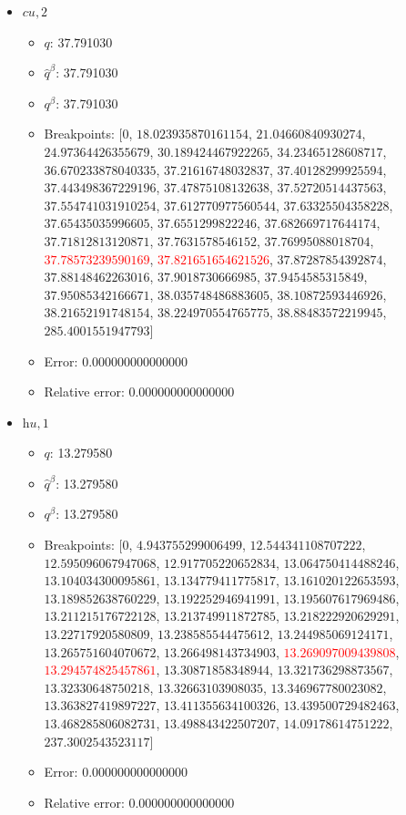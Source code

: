 \documentclass{article}%
\begin{document}
\begin{itemize}
\begin{itemize}
		\item Error: 0.000000000000000%
		\item Relative error: 0.000000000000000%
	\end{itemize}%
	\item $\textit{cu},2$%
	\begin{itemize}%
		\item $q$: 37.791030%
		\item $\hat{q}^\beta$: 37.791030%
		\item $q^\beta$: 37.791030%
		\item Breakpoints: $[$$0$, $18.023935870161154$, $21.04660840930274$, $24.97364426355679$, $30.189424467922265$, $34.23465128608717$, $36.670233878040335$, $37.21616748032837$, $37.40128299925594$, $37.443498367229196$, $37.47875108132638$, $37.52720514437563$, $37.554741031910254$, $37.612770977560544$, $37.63325504358228$, $37.65435035996605$, $37.6551299822246$, $37.682669717644174$, $37.71812813120871$, $37.7631578546152$, $37.76995088018704$, \textcolor{red}{$37.78573239590169$}, \textcolor{red}{$37.821651654621526$}, $37.87287854392874$, $37.88148462263016$, $37.9018730666985$, $37.9454585315849$, $37.95085342166671$, $38.035748486883605$, $38.10872593446926$, $38.21652191748154$, $38.224970554765775$, $38.88483572219945$, $285.4001551947793$$]$%
		\item Error: 0.000000000000000%
		\item Relative error: 0.000000000000000%
	\end{itemize}%
	\item $\textit{hu},1$%
	\begin{itemize}%
		\item $q$: 13.279580%
		\item $\hat{q}^\beta$: 13.279580%
		\item $q^\beta$: 13.279580%
		\item Breakpoints: $[$$0$, $4.943755299006499$, $12.544341108707222$, $12.595096067947068$, $12.917705220652834$, $13.064750414488246$, $13.104034300095861$, $13.134779411775817$, $13.161020122653593$, $13.189852638760229$, $13.192252946941991$, $13.195607617969486$, $13.211215176722128$, $13.213749911872785$, $13.218222920629291$, $13.22717920580809$, $13.238585544475612$, $13.244985069124171$, $13.265751604070672$, $13.266498143734903$, \textcolor{red}{$13.269097009439808$}, \textcolor{red}{$13.294574825457861$}, $13.30871858348944$, $13.321736298873567$, $13.32330648750218$, $13.32663103908035$, $13.346967780023082$, $13.363827419897227$, $13.411355634100326$, $13.439500729482463$, $13.468285806082731$, $13.498843422507207$, $14.09178614751222$, $237.3002543523117$$]$%
		\item Error: 0.000000000000000%
		\item Relative error: 0.000000000000000%
	\end{itemize}%
\end{itemize}%
\end{document}
